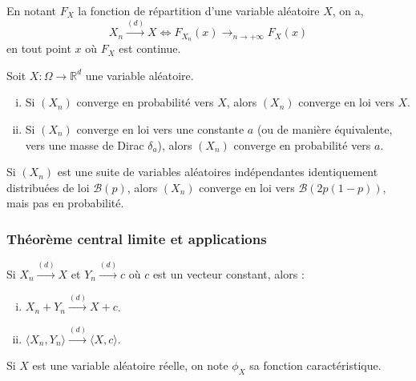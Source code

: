 
	\begin{theorem}
		En notant $F_X$ la fonction de répartition d'une variable aléatoire $X$, on a,
		\[ X_n \overset{(d)}{\longrightarrow} X \iff F_{X_n}(x) \longrightarrow_{n \rightarrow +\infty} F_X(x) \]
		en tout point $x$ où $F_X$ est continue.
	\end{theorem}

	\begin{theorem}
		Soit $X : \Omega \rightarrow \mathbb{R}^d$ une variable aléatoire.
		\begin{enumerate}[(i)]
			\item Si $(X_n)$ converge en probabilité vers $X$, alors $(X_n)$ converge en loi vers $X$.
			\item Si $(X_n)$ converge en loi vers une constante $a$ (ou de manière équivalente, vers une masse de Dirac $\delta_a$), alors $(X_n)$ converge en probabilité vers $a$.
		\end{enumerate}
	\end{theorem}


	\begin{cexample}
		Si $(X_n)$ est une suite de variables aléatoires indépendantes identiquement distribuées de loi $\mathcal{B}(p)$, alors $(X_n)$ converge en loi vers $\mathcal{B}(2p(1-p))$, mais pas en probabilité.
	\end{cexample}

	\subsubsection{Théorème central limite et applications}


	\begin{theorem}[Slutsky]
		Si $X_n \overset{(d)}{\longrightarrow} X$ et $Y_n \overset{(d)}{\longrightarrow} c$ où $c$ est un vecteur constant, alors :
		\begin{enumerate}[(i)]
			\item $X_n + Y_n \overset{(d)}{\longrightarrow} X + c$.
			\item $\langle X_n, Y_n \rangle \overset{(d)}{\longrightarrow} \langle X, c \rangle$.
		\end{enumerate}
	\end{theorem}

	\begin{notation}
		Si $X$ est une variable aléatoire réelle, on note $\phi_X$ sa fonction caractéristique.
	\end{notation}

